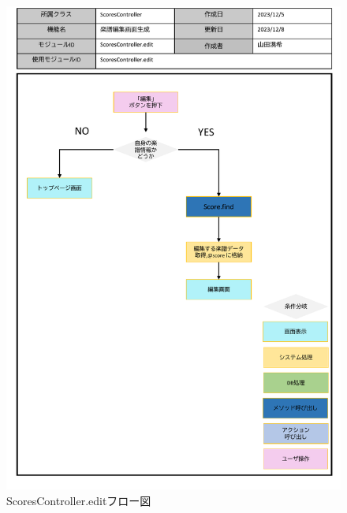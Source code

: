 \begin{figure}
    \centering
    \includegraphics[scale=0.6]{img/Scores/pptx/ScoresController_edit.pdf}
    \caption{ScoresController.editフロー図}
\end{figure}
\clearpage

